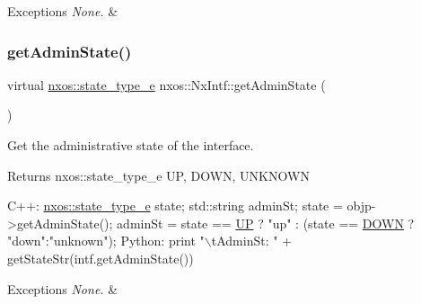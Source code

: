 \begin{DoxyExceptions}{Exceptions}
{\em None.} & \\
\hline
\end{DoxyExceptions}
\mbox{\label{classnxos_1_1_nx_intf_a161d3222b8e6f5dff510eef2406996fb}} 
\subsubsection{\texorpdfstring{get\+Admin\+State()}{getAdminState()}}
{\footnotesize\ttfamily virtual \mbox{\hyperlink{nx__common_8h_a7c257059d03188765435b36e95dbb764}{nxos\+::state\+\_\+type\+\_\+e}} nxos\+::\+Nx\+Intf\+::get\+Admin\+State (\begin{DoxyParamCaption}{ }\end{DoxyParamCaption})\hspace{0.3cm}{\ttfamily [pure virtual]}}

Get the administrative state of the interface.

\begin{DoxyReturn}{Returns}
nxos\+::state\+\_\+type\+\_\+e UP, D\+O\+WN, U\+N\+K\+N\+O\+WN
\end{DoxyReturn}

\begin{DoxyCode}
C++:
    \mbox{\hyperlink{nx__common_8h_a7c257059d03188765435b36e95dbb764}{nxos::state\_type\_e}}  state;
    std::string adminSt;
    state   = objp->getAdminState();
    adminSt = state == \mbox{\hyperlink{nx__common_8h_a7c257059d03188765435b36e95dbb764a7f57fa197f0e274e5c5d10c64d0f9436}{UP}} ? \textcolor{stringliteral}{"up"} : 
                  (state == \mbox{\hyperlink{nx__common_8h_a7c257059d03188765435b36e95dbb764aa0756be42dc77ad57cf532f5c02e4c0a}{DOWN}} ? \textcolor{stringliteral}{"down"}:\textcolor{stringliteral}{"unknown"});
Python:
     print \textcolor{stringliteral}{"\(\backslash\)tAdminSt: "} + getStateStr(intf.getAdminState())
\end{DoxyCode}



\begin{DoxyExceptions}{Exceptions}
{\em None.} & \\
\hline
\end{DoxyExceptions}
\mbox{\label{classnxos_1_1_nx_intf_ae18aa83b5f9984c6b133a8d447aa5430}} 
